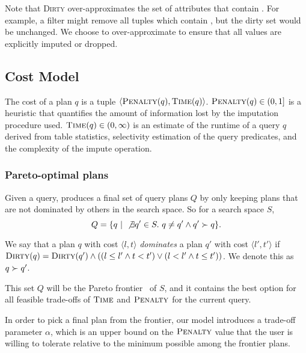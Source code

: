 Note that \textsc{Dirty} over-approximates the set of attributes that contain \nullv{}. For example, a filter might remove all tuples which contain \nullv{}, but the dirty set would be unchanged. We choose to over-approximate to ensure that all \nullv{} values are explicitly imputed or dropped.


\subsection{Cost Model}
\label{sec:cost-model}
The cost of a plan $q$ is a tuple $\langle \textsc{Penalty}(q), \textsc{Time}(q) \rangle$.
$\textsc{Penalty}(q) \in (0,1]$ is a heuristic that quantifies the amount of information lost by the imputation procedure used.
$\textsc{Time}(q) \in (0, \infty)$ is an estimate of the runtime of a query $q$ derived from table statistics, selectivity estimation of the query predicates, and the complexity of the
impute operation. 

\subsubsection{Pareto-optimal plans}\label{subsubsec:pareto}
Given a query, \ProjectName{} produces a final set of query plans $Q$ by only keeping plans that are not dominated by others in the search space. So for a search space $S$, \[Q= \{ q ~|~ \not\exists q' \in S.\ q \neq q' \land q' \succ q \}.\]

\begin{definition}
We say that a plan $q$ with cost $\langle l, t \rangle$ \emph{dominates} a plan $q'$ with cost $\langle l', t' \rangle$ if $\textsc{Dirty}(q) = \textsc{Dirty}(q') \land ((l \leq l' \land t < t') \lor (l < l' \land t \leq t'))$. We denote this as $q \succ q'$. 
\end{definition}

This set $Q$ will be the Pareto frontier~\cite{pareto1964cours} of $S$, and it contains the best option for all feasible trade-offs of $\textsc{Time}$ and $\textsc{Penalty}$ for the current query. 

In order to pick a final plan from the frontier, our model introduces a trade-off parameter $\alpha$, which is an upper bound on the $\textsc{Penalty}$ value that the user is willing
to tolerate relative to the minimum possible among the frontier plans.


